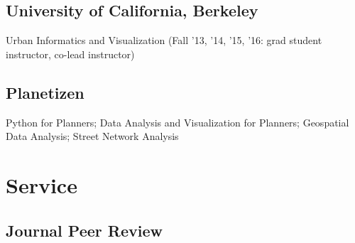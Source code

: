 \documentclass[12pt,letterpaper]{report}
\newcommand{\listitemspace}{0.15em}
\renewenvironment{itemize}
{\begin{list}{}{\setlength{\leftmargin}{0em}
			\setlength{\parskip}{0em}
			\setlength{\itemsep}{\listitemspace}
			\setlength{\parsep}{\listitemspace}}}
	{\end{list}}
\begin{document}
	\subsection*{University of California, Berkeley}

	\begin{itemize}

		\item Urban Informatics and Visualization (Fall '13, '14, '15, '16: grad student instructor, co-lead instructor)

	\end{itemize}

	\subsection*{Planetizen}

	\begin{itemize}

		\item Python for Planners; Data Analysis and Visualization for Planners; Geospatial Data Analysis; Street Network Analysis

	\end{itemize}


	\section*{Service}

	\subsection*{Journal Peer Review}
\end{document}
